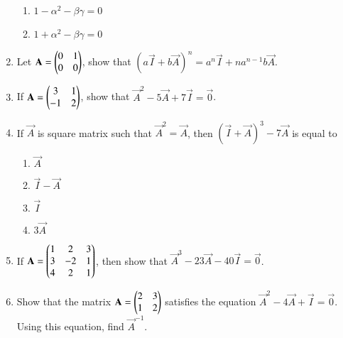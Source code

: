 \begin{enumerate}[label=\thesubsection.\arabic*,ref=\thesubsection.\theenumi]
\begin{enumerate}
\item $1-\alpha^2- \beta \gamma=0$
\item $1+\alpha^2- \beta \gamma=0$ 
\end{enumerate}
\item Let $\mathbf{A}=\begin{pmatrix}0 & 1\\ 0 & 0\end{pmatrix}$, show that $(a\vec{I}+b\vec{A})^n= a^n\vec{I}+na^{n-1} b\vec{A}$.
\item If $\mathbf{A}=\begin{pmatrix}3 & 1\\ -1 & 2\end{pmatrix}$, show that $\vec{A}^2-5\vec{A}+7\vec{I}=\vec{0}$.
\item If $\vec{A}$ is square matrix such that $\vec{A}^2=\vec{A}$, then $(\vec{I}+\vec{A})^3-7\vec{A}$ is equal to
\begin{enumerate}
\item $\vec{A}$
\item $\vec{I}-\vec{A}$
\item $\vec{I}$
\item $3\vec{A}$
\end{enumerate}
\item If $\mathbf{A}=\begin{pmatrix}1&2&3\\3&-2&1\\4&2&1\end{pmatrix}$, then show that $\vec{A}^3-23\vec{A}-40\vec{I}=\vec{0}$.
\item Show that the matrix $\mathbf{A}=\begin{pmatrix}2&3 \\1&2\end{pmatrix}$ satisfies the equation $\vec{A}^2-4\vec{A}+\vec{I}=\vec{0}$. Using this equation, find $\vec{A}^{-1}$.
\end{enumerate}
